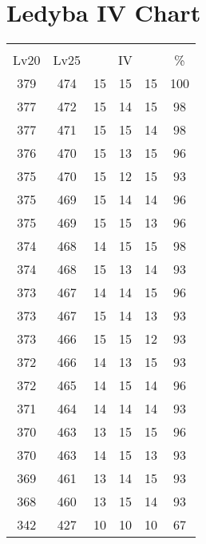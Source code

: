 \documentclass{article}%
\begin{document}
%
\normalsize%
\section{Ledyba IV Chart}%
\label{sec:Ledyba IV Chart}%
\renewcommand{\arraystretch}{1.5}%
\begin{tabular}{|c|c|c|c|c|c|}%
\hline%
\multicolumn{6}{|c|}{\textcolor{white}{ 
\linebreak{Ledyba}
}%
\cellcolor{black}}\\%
\multicolumn{1}{|c}{Lv20}&\multicolumn{1}{c|}{Lv25}&\multicolumn{3}{c|}{IV}&\multicolumn{1}{|c|}{\%}\\%
\hline%
\rowcolor{color100}%
379&474&15&15&15&100\\%
\hline%
\rowcolor{color98}%
377&472&15&14&15&98\\%
\hline%
\rowcolor{color98}%
377&471&15&15&14&98\\%
\hline%
\rowcolor{color96}%
376&470&15&13&15&96\\%
\hline%
\rowcolor{color93}%
375&470&15&12&15&93\\%
\hline%
\rowcolor{color96}%
375&469&15&14&14&96\\%
\hline%
\rowcolor{color96}%
375&469&15&15&13&96\\%
\hline%
\rowcolor{color98}%
374&468&14&15&15&98\\%
\hline%
\rowcolor{color93}%
374&468&15&13&14&93\\%
\hline%
\rowcolor{color96}%
373&467&14&14&15&96\\%
\hline%
\rowcolor{color93}%
373&467&15&14&13&93\\%
\hline%
\rowcolor{color93}%
373&466&15&15&12&93\\%
\hline%
\rowcolor{color93}%
372&466&14&13&15&93\\%
\hline%
\rowcolor{color96}%
372&465&14&15&14&96\\%
\hline%
\rowcolor{color93}%
371&464&14&14&14&93\\%
\hline%
\rowcolor{color96}%
370&463&13&15&15&96\\%
\hline%
\rowcolor{color93}%
370&463&14&15&13&93\\%
\hline%
\rowcolor{color93}%
369&461&13&14&15&93\\%
\hline%
\rowcolor{color93}%
368&460&13&15&14&93\\%
\hline%
\rowcolor{color91}%
342&427&10&10&10&67\\%
\end{tabular}

%
\end{document}
